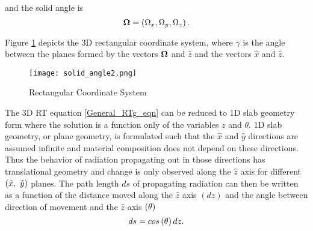 	and the solid angle is
	\begin{equation}
		\bm{\Omega} = \left(\Omega_x, \Omega_y, \Omega_z\right).
	\end{equation}
	
	
	
	
	
	Figure \ref{fig:solid_angle} depicts the 3D rectangular coordinate system, where $\gamma$ is the angle between the planes formed by the vectors $\bm{\Omega}$ and $\hat{z}$ and the vectors $\hat{x}$ and $\hat{z}$.
	\begin{figure}[h]
		\centering
		\captionsetup{justification=centering,margin=2cm}
		\texttt{[image: solid\_angle2.png]} 
		\caption{\label{fig:solid_angle}
			Rectangular Coordinate System}
	\end{figure}

	
	The 3D RT equation \eqref{General_RTg_eqn} can be reduced to 1D slab geometry form where the solution is a function only of the variables $z$ and $\theta$. 1D slab geometry, or plane geometry, is formulated such that the $\hat{x}$ and $\hat{y}$ directions are assumed infinite and material composition does not depend on these directions. Thus the behavior of radiation propagating out in those directions has translational geometry and change is only observed along the $\hat{z}$ axis for different $\pr{\hat{x}, \ \hat{y}}$ planes. The path length $ds$ of propagating radiation can then be written as a function of the distance moved along the $\hat{z}$ axis $(dz)$ and the angle between direction of movement and the $\hat{z}$ axis $\left(\theta\right)$
	\begin{equation}
		ds = cos\left(\theta\right) dz. \label{ds}
	\end{equation}
	
